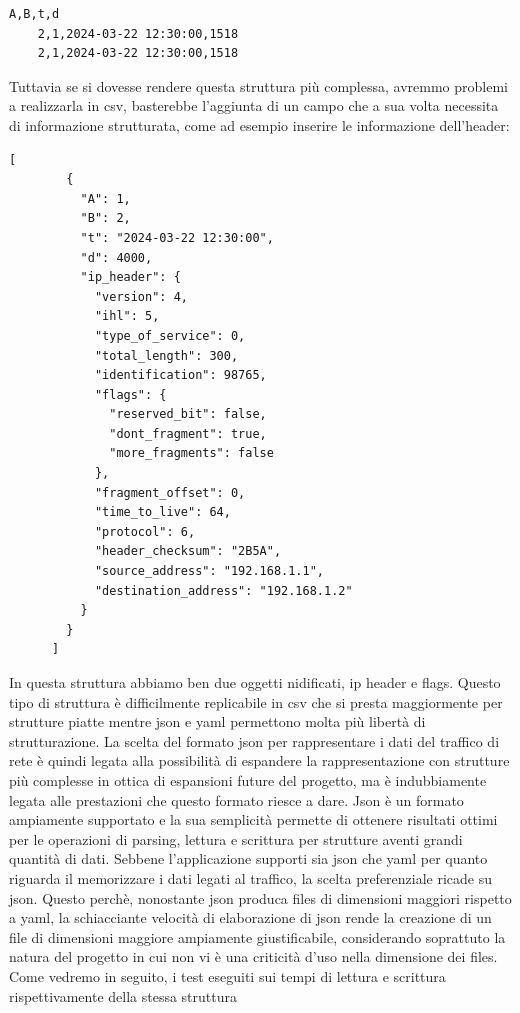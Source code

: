 \documentclass[binding=0.6cm]{sapthesis}
\begin{document}
\begin{lstlisting}[caption={pacchetti di rete rappresentati in csv}]
    A,B,t,d
    2,1,2024-03-22 12:30:00,1518
    2,1,2024-03-22 12:30:00,1518
\end{lstlisting}
Tuttavia se si dovesse rendere questa struttura più complessa, avremmo problemi a realizzarla in csv, basterebbe l'aggiunta
di un campo che a sua volta necessita di informazione strutturata, come ad esempio 
inserire le informazione dell'header:
\begin{lstlisting}[caption={pacchetto di rete maggiormente strutturate in json}]
    [
        {
          "A": 1,
          "B": 2,
          "t": "2024-03-22 12:30:00",
          "d": 4000,
          "ip_header": {
            "version": 4,
            "ihl": 5,
            "type_of_service": 0,
            "total_length": 300,
            "identification": 98765,
            "flags": {
              "reserved_bit": false,
              "dont_fragment": true,
              "more_fragments": false
            },
            "fragment_offset": 0,
            "time_to_live": 64,
            "protocol": 6,
            "header_checksum": "2B5A",
            "source_address": "192.168.1.1",
            "destination_address": "192.168.1.2"
          }
        }
      ]
\end{lstlisting}
In questa struttura abbiamo ben due oggetti nidificati, ip header e flags. 
Questo tipo di struttura è difficilmente replicabile in csv che si presta maggiormente
per strutture piatte mentre json e yaml permettono molta più libertà di strutturazione.
La scelta del formato json per rappresentare i dati del traffico di rete è quindi legata alla possibilità di espandere la
rappresentazione con strutture più complesse in ottica di espansioni future del progetto, ma è indubbiamente legata alle prestazioni che questo formato riesce a dare.
Json è un formato ampiamente supportato e la sua semplicità permette di ottenere risultati ottimi per le operazioni di parsing, lettura e scrittura per strutture aventi grandi quantità di dati.
Sebbene l'applicazione supporti sia json che yaml per quanto riguarda il memorizzare i dati legati al traffico, la scelta preferenziale ricade su json.
Questo perchè, nonostante json produca files di dimensioni maggiori rispetto a yaml, la schiacciante velocità di elaborazione di json rende la creazione di
un file di dimensioni maggiore ampiamente giustificabile, considerando soprattuto la natura del progetto in cui non vi è una
criticità d'uso nella dimensione dei files. Come vedremo in seguito, i test eseguiti sui tempi di lettura e scrittura rispettivamente della stessa struttura
\end{document}
